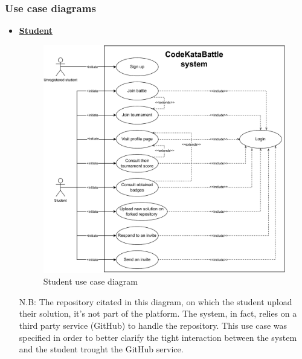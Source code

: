 \documentclass{article}
\begin{document}
{%
\newpage

\subsubsection{Use case diagrams}
\begin{itemize}
    \item \underline{\large{\textbf{Student}}}
          \begin{figure}[H]
              \centering
              \includegraphics[scale=0.55]{images/3.2.2_UseCaseDiagrams/CaseDiagramStudent.pdf}
              \caption{Student use case diagram}
              \label{fig:studentUseCaseDiagram}
          \end{figure}

          N.B: The repository citated in this diagram, on which the student upload their solution, it's not
          part of the platform. The system, in fact, relies on a third party service (GitHub) to handle the repository.
          This use case was specified in order to better clarify the tight interaction between the system and the student trought the GitHub service.

          \newpage


\end{itemize}}
\end{document}
